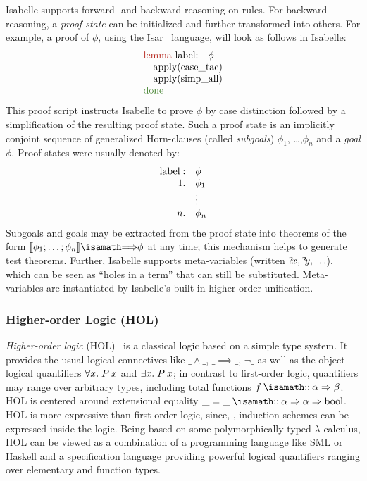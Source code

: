 Isabelle supports forward- and backward reasoning on rules.  For
backward-reasoning, a \emph{proof-state} can be initialized and
further transformed into others. For example, a proof of $\phi$, using
the Isar~\cite{wenzel:isabelleisar:2002} language, will look as
follows in Isabelle:
\begin{gather}
  \begin{array}{l}
    \Lemma{label} \phi\\
    \quad\apply{case\_tac}\\
    \quad\apply{simp\_all}\\
  \done
  \end{array}
\end{gather}
This proof script instructs Isabelle to prove $\phi$ by case
distinction followed by a simplification of the resulting proof state.
Such a proof state is an implicitly conjoint sequence of generalized
Horn-clauses (called \emph{subgoals}) $\phi_1$, \ldots,$\phi_n$ and a
\emph{goal} $\phi$. Proof states were usually denoted by:
\begin{gather}
\begin{array}{rl}
\text{label}:& \phi \\
 1.& \phi_1 \\
    &\vdots \\
 n.& \phi_n\\
\end{array}
\end{gather}
Subgoals and goals may be extracted from the proof state into theorems
of the form $\semantics{\phi_1 ; \ldots; \phi_n}\Implies \phi$ at any
time; this mechanism helps to generate test theorems.  Further,
Isabelle supports meta-variables (written $?\!x, ?\!y,
\ldots$), which can be seen as ``holes in a term'' that can still be
substituted. Meta-variables are instantiated by Isabelle's built-in
higher-order unification.

\subsubsection{Higher-order Logic (HOL)}
\emph{Higher-order logic}
(HOL)~\cite{church:types:1940,andrews:introduction:2002} is a
classical logic based on a simple type system.  It provides the usual
logical connectives like $\_ \land \_$, $\_ \implies\_$, $\lnot \_ $
as well as the object-logical quantifiers $\forall x.\; P\: x$ and
$\exists x.\; P\: x$; in contrast to first-order logic, quantifiers
may range over arbitrary types, including total functions
$f\ofType\alpha \Rightarrow \beta$. HOL is centered around
extensional equality $\_ = \_ \ofType \alpha \Rightarrow \alpha
\Rightarrow \text{bool}$.  HOL is more expressive than first-order
logic, since, \eg, induction schemes can be expressed inside the
logic. Being based on some polymorphically typed $\lambda$-calculus,
HOL can be viewed as a combination of a programming language
like SML or Haskell and a specification language providing
powerful logical quantifiers ranging over elementary and function
types.

